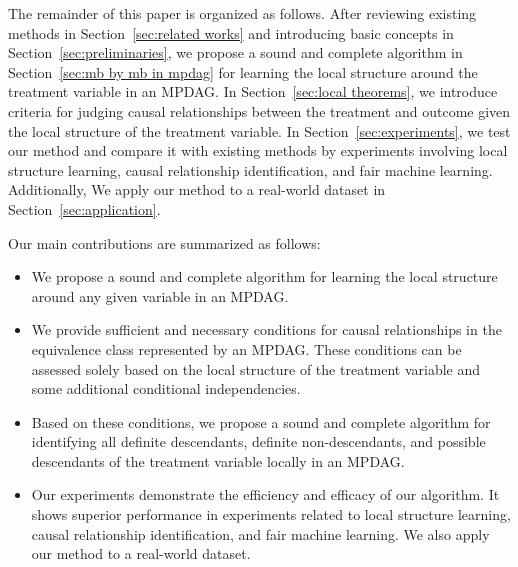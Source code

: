 \documentclass{article}
\begin{document}
The remainder of this paper is organized as follows. 
After reviewing existing methods in Section~\ref{sec:related works} and introducing basic concepts in Section~\ref{sec:preliminaries}, we propose a sound and complete algorithm in Section~\ref{sec:mb by mb in mpdag} for learning the local structure around the treatment variable in an MPDAG.
In Section~\ref{sec:local theorems}, we introduce criteria for judging causal relationships between the treatment and outcome given the local structure of the treatment variable.
In Section~\ref{sec:experiments}, we test our method and compare it with existing methods by experiments involving local structure learning, causal relationship identification, and fair machine learning.
Additionally, We apply our method to a real-world dataset in Section~\ref{sec:application}.

Our main contributions are summarized as follows:
\begin{itemize}
    \item We propose a sound and complete algorithm for learning the local structure around any given variable in an MPDAG.
    \item We provide sufficient and necessary conditions for causal relationships in the equivalence class represented by an MPDAG. These conditions can be assessed solely based on the local structure of the treatment variable and some additional conditional independencies.
    \item Based on these conditions, we propose a sound and complete algorithm for identifying all definite descendants, definite non-descendants, and possible descendants of the treatment variable locally in an MPDAG.
    \item Our experiments demonstrate the efficiency and efficacy of our algorithm. It shows superior performance in experiments related to local structure learning, causal relationship identification, and fair machine learning. We also apply our method to a real-world dataset.
\end{itemize}
\end{document}
